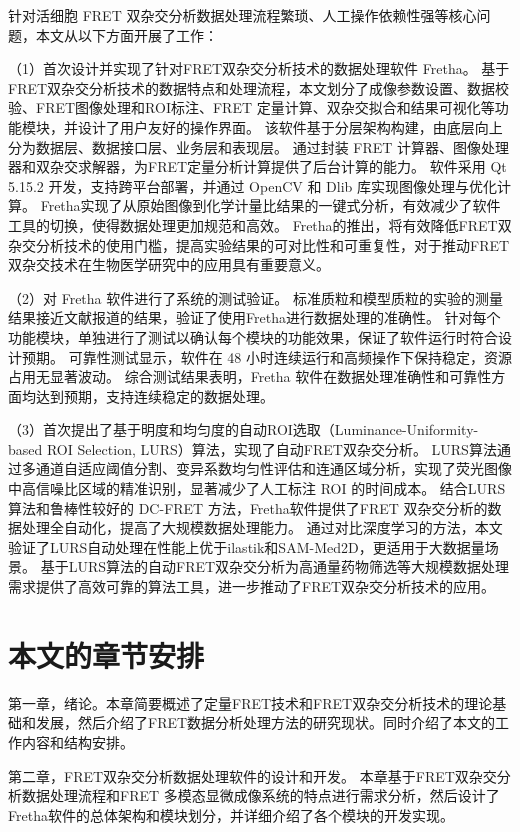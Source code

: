 针对活细胞 FRET 双杂交分析数据处理流程繁琐、人工操作依赖性强等核心问题，本文从以下方面开展了工作：

（1）首次设计并实现了针对FRET双杂交分析技术的数据处理软件 Fretha。
基于FRET双杂交分析技术的数据特点和处理流程，本文划分了成像参数设置、数据校验、FRET图像处理和ROI标注、FRET 定量计算、双杂交拟合和结果可视化等功能模块，并设计了用户友好的操作界面。
该软件基于分层架构构建，由底层向上分为数据层、数据接口层、业务层和表现层。
通过封装 FRET 计算器、图像处理器和双杂交求解器，为FRET定量分析计算提供了后台计算的能力。
软件采用 Qt 5.15.2 开发，支持跨平台部署，并通过 OpenCV 和 Dlib 库实现图像处理与优化计算。
Fretha实现了从原始图像到化学计量比结果的一键式分析，有效减少了软件工具的切换，使得数据处理更加规范和高效。
Fretha的推出，将有效降低FRET双杂交分析技术的使用门槛，提高实验结果的可对比性和可重复性，对于推动FRET双杂交技术在生物医学研究中的应用具有重要意义。

（2）对 Fretha 软件进行了系统的测试验证。
标准质粒和模型质粒的实验的测量结果接近文献报道的结果，验证了使用Fretha进行数据处理的准确性。
针对每个功能模块，单独进行了测试以确认每个模块的功能效果，保证了软件运行时符合设计预期。
可靠性测试显示，软件在 48 小时连续运行和高频操作下保持稳定，资源占用无显著波动。
综合测试结果表明，Fretha 软件在数据处理准确性和可靠性方面均达到预期，支持连续稳定的数据处理。

（3）首次提出了基于明度和均匀度的自动ROI选取（Luminance-Uniformity-based ROI Selection, LURS）算法，实现了自动FRET双杂交分析。
LURS算法通过多通道自适应阈值分割、变异系数均匀性评估和连通区域分析，实现了荧光图像中高信噪比区域的精准识别，显著减少了人工标注 ROI 的时间成本。
结合LURS算法和鲁棒性较好的 DC-FRET 方法，Fretha软件提供了FRET 双杂交分析的数据处理全自动化，提高了大规模数据处理能力。
通过对比深度学习的方法，本文验证了LURS自动处理在性能上优于ilastik和SAM-Med2D，更适用于大数据量场景。
基于LURS算法的自动FRET双杂交分析为高通量药物筛选等大规模数据处理需求提供了高效可靠的算法工具，进一步推动了FRET双杂交分析技术的应用。

\section{本文的章节安排}
第一章，绪论。本章简要概述了定量FRET技术和FRET双杂交分析技术的理论基础和发展，然后介绍了FRET数据分析处理方法的研究现状。同时介绍了本文的工作内容和结构安排。

第二章，FRET双杂交分析数据处理软件的设计和开发。
本章基于FRET双杂交分析数据处理流程和FRET 多模态显微成像系统的特点进行需求分析，然后设计了Fretha软件的总体架构和模块划分，并详细介绍了各个模块的开发实现。

